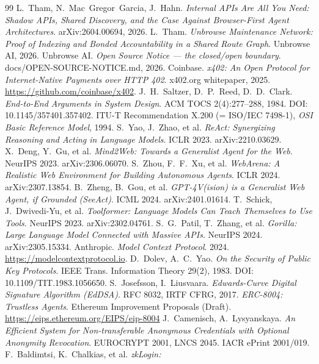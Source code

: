 \documentclass[11pt]{article}
\begin{document}
\begin{thebibliography}{99}
 L.~Tham, N.~Mac~Gregor~Garcia, J.~Hahn. \emph{Internal APIs Are All
You Need: Shadow APIs, Shared Discovery, and the Case Against Browser-First Agent
Architectures}. arXiv:2604.00694, 2026.
 L.~Tham. \emph{Unbrowse Maintenance Network: Proof of Indexing
and Bonded Accountability in a Shared Route Graph}. Unbrowse AI, 2026.
 Unbrowse AI. \emph{Open Source Notice --- the closed/open boundary}. docs/OPEN-SOURCE-NOTICE.md, 2026.
 Coinbase. \emph{x402: An Open Protocol for Internet-Native
Payments over HTTP 402}. x402.org whitepaper, 2025. \url{https://github.com/coinbase/x402}.
 J.~H.~Saltzer, D.~P.~Reed, D.~D.~Clark. \emph{End-to-End Arguments
in System Design}. ACM TOCS 2(4):277--288, 1984. DOI: 10.1145/357401.357402.
 ITU-T Recommendation X.200 (= ISO/IEC 7498-1), \emph{OSI Basic
Reference Model}, 1994.
 S.~Yao, J.~Zhao, et al. \emph{ReAct: Synergizing Reasoning and Acting in Language Models}. ICLR 2023. arXiv:2210.03629.
 X.~Deng, Y.~Gu, et al. \emph{Mind2Web: Towards a Generalist Agent for the Web}. NeurIPS 2023. arXiv:2306.06070.
 S.~Zhou, F.~F.~Xu, et al. \emph{WebArena: A Realistic Web Environment for Building Autonomous Agents}. ICLR 2024. arXiv:2307.13854.
 B.~Zheng, B.~Gou, et al. \emph{GPT-4V(ision) is a Generalist Web Agent, if Grounded (SeeAct)}. ICML 2024. arXiv:2401.01614.
 T.~Schick, J.~Dwivedi-Yu, et al. \emph{Toolformer: Language Models Can Teach Themselves to Use Tools}. NeurIPS 2023. arXiv:2302.04761.
 S.~G.~Patil, T.~Zhang, et al. \emph{Gorilla: Large Language Model Connected with Massive APIs}. NeurIPS 2024. arXiv:2305.15334.
 Anthropic. \emph{Model Context Protocol}. 2024. \url{https://modelcontextprotocol.io}.
 D.~Dolev, A.~C.~Yao. \emph{On the Security of Public Key Protocols}. IEEE Trans. Information Theory 29(2), 1983. DOI: 10.1109/TIT.1983.1056650.
 S.~Josefsson, I.~Liusvaara. \emph{Edwards-Curve Digital
Signature Algorithm (EdDSA)}. RFC 8032, IRTF CFRG, 2017.
 \emph{ERC-8004: Trustless Agents}. Ethereum Improvement
Proposals (Draft). \url{https://eips.ethereum.org/EIPS/eip-8004}
 J.~Camenisch, A.~Lysyanskaya. \emph{An Efficient System for
Non-transferable Anonymous Credentials with Optional Anonymity Revocation}.
EUROCRYPT 2001, LNCS 2045. IACR ePrint 2001/019.
 F.~Baldimtsi, K.~Chalkias, et al. \emph{zkLogin:
}
\end{thebibliography}
\end{document}
